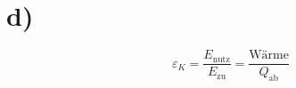 

\section*{d)}
\begin{equation*}
    \varepsilon_K = \frac{E_{\text{nutz}}}{E_{\text{zu}}} = \frac{\text{Wärme}}{Q_{\text{ab}}}
\end{equation*}